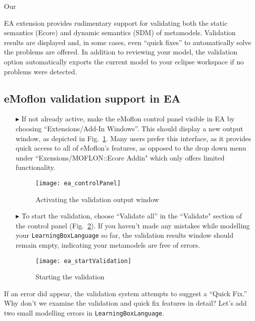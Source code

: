 \visHeader

\hypertarget{validation vis}{Our} EA extension provides rudimentary support for validating both the static semantics (Ecore) and dynamic semantics (SDM) of
metamodels. Validation results are displayed and, in some cases, even ``quick fixes'' to automatically solve the problems are offered. In addition to reviewing
your model, the validation option automatically exports the current model to your eclipse workspace if no problems were detected.

\subsection{eMoflon validation support in EA}

\begin{enumerate}
\item[$\blacktriangleright$] If not already active, make the eMoflon control panel visible in EA by choosing ``Extensions/\-Add-In Windows''. This should
display a new output window, as depicted in Fig.~\ref{fig:validation_output}. Many users prefer this interface, as it provides quick access to all of eMoflon's
features, as opposed to the drop down menu under ``Exensions/MOFLON::Ecore Addin" which only offers limited functionality.

\begin{figure}[htbp]
	\centering
  \texttt{[image: ea\_controlPanel]}
	\caption{Activating the validation output window}
	\label{fig:validation_output}
\end{figure}
\FloatBarrier

\clearpage
\item[$\blacktriangleright$] To start the validation, choose ``Validate all'' in the ``Validate" section of the control panel
(Fig.~\ref{fig:validation_menu}). If you haven't made any mistakes while modelling your \texttt{LearningBoxLanguage} so far, the validation results window
should remain empty, indicating your metamodels are free of errors.

\begin{figure}[htbp]
	\centering
  \texttt{[image: ea\_startValidation]}
	\caption{Starting the validation}
	\label{fig:validation_menu}
\end{figure}
\FloatBarrier
\end{enumerate}

If an error did appear, the validation system attempts to suggest a ``Quick Fix.'' Why don't we examine the validation and quick fix features in detail? Let's
add two small modelling errors in \texttt{LearningBoxLanguage}.

